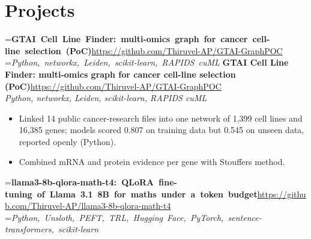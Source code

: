 \documentclass[a4paper,11pt]{article}
\newcommand{\project}[3]{%
  \textbf{#1}\hfill#3\\ {\color{muted}\small\textit{#2}}\par}
\newcommand{\gap}{\vspace{5pt}}
\begin{document}
\section{Projects}
=\hbox{\textbf{GTAI Cell Line Finder: multi-omics graph for cancer cell-line selection (PoC)}\hspace{1em}\url{https://github.com/Thiruvel-AP/GTAI-GraphPOC}}%
=\hbox{{\small\textit{Python, networkx, Leiden, scikit-learn, RAPIDS cuML}}}%
\ifdim\wd0>\linewidth
\ifdim\wd2>\linewidth
\textbf{GTAI Cell Line Finder: multi-omics graph for cancer cell-line selection (PoC)}\\ {\color{muted}\small\textit{Python, networkx, Leiden, scikit-learn, RAPIDS cuML}}\\ \hspace*{\fill}{\small\url{https://github.com/Thiruvel-AP/GTAI-GraphPOC}}\par
\else
\textbf{GTAI Cell Line Finder: multi-omics graph for cancer cell-line selection (PoC)}\\ {\color{muted}\small\textit{Python, networkx, Leiden, scikit-learn, RAPIDS cuML}}\hfill{\small\url{https://github.com/Thiruvel-AP/GTAI-GraphPOC}}\par
\fi
\else
\project{GTAI Cell Line Finder: multi-omics graph for cancer cell-line selection (PoC)}{Python, networkx, Leiden, scikit-learn, RAPIDS cuML}{\url{https://github.com/Thiruvel-AP/GTAI-GraphPOC}}
\fi
\begin{itemize}
  \item Linked 14 public cancer-research files into one network of 1,399 cell lines and 16,385 genes; models scored 0.807 on training data but 0.545 on unseen data, reported openly (Python).
  \item Combined mRNA and protein evidence per gene with Stouffer\textquotesingle{}s method.
\end{itemize}
\gap
{}
=\hbox{\textbf{llama3-8b-qlora-math-t4: QLoRA fine-tuning of Llama 3.1 8B for maths under a token budget}\hspace{1em}\url{https://github.com/Thiruvel-AP/llama3-8b-qlora-math-t4}}%
=\hbox{{\small\textit{Python, Unsloth, PEFT, TRL, Hugging Face, PyTorch, sentence-transformers, scikit-learn}}}%
\end{document}

